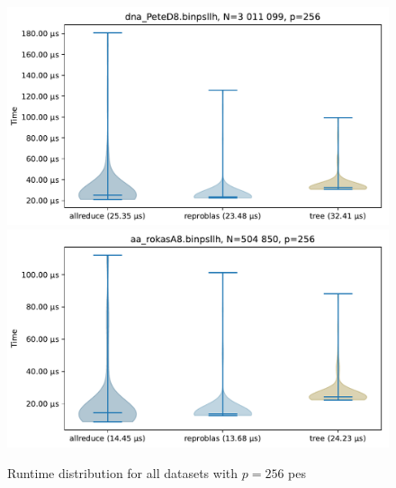 \begin{figure}\centering\ContinuedFloat
\includegraphics[scale=\mScale]{figures/violinPeteD8.pdf}
\includegraphics[scale=\mScale]{figures/violinRokasA8.pdf}

\caption{Runtime distribution for all datasets with $p=256$ \glspl{pe}}

\end{figure}

